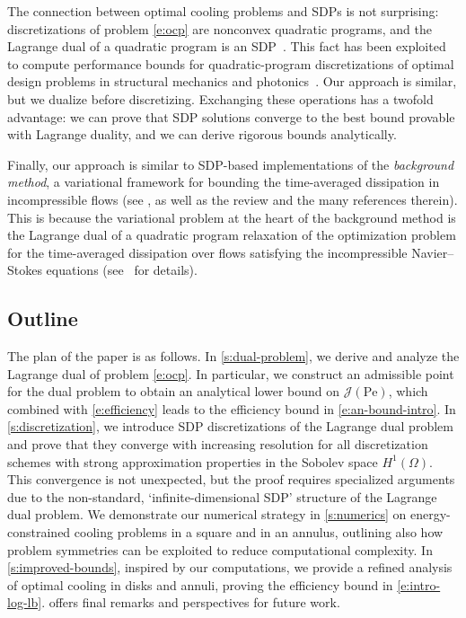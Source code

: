 \documentclass[a4paper, 10pt]{amsart}
\numberwithin{equation}{section}
\theoremstyle{plain}
\theoremstyle{definition}
\theoremstyle{remark}
\newcommand{\Pe}{\mathrm{Pe}}
\newcommand{\ocpval}{\mathcal{J}}
\begin{document}
The connection between optimal cooling problems and SDPs is not surprising: discretizations of problem \cref{e:ocp} are nonconvex quadratic programs, and the Lagrange dual of a quadratic program is an SDP~\cite{Shor1987,Nesterov2000}. This fact has been exploited to compute performance bounds for quadratic-program discretizations of optimal design problems in structural mechanics and photonics~\cite{Tyburec2019,Angeris2019,Angeris2021,Gertler2025,Dalklint2025}. Our approach is similar, but we dualize before discretizing. Exchanging these operations has a twofold advantage: we can prove that SDP solutions converge to the best bound provable with Lagrange duality, and we can derive rigorous bounds analytically. 

Finally, our approach is similar to SDP-based implementations of the \emph{background method}, a variational framework for bounding the time-averaged dissipation in incompressible flows (see \cite{Doering1994,Constantin1995,Doering1996}, as well as the review \cite{Fantuzzi2022} and the many references therein). This is because the variational problem at the heart of the background method is the Lagrange dual of a quadratic program relaxation of the optimization problem for the time-averaged dissipation over flows satisfying the incompressible Navier--Stokes equations (see~\cite{Kerswell1998,Kerswell1999} for details).

\subsection{Outline}
The plan of the paper is as follows. In \cref{s:dual-problem}, we derive and analyze the Lagrange dual of problem \cref{e:ocp}. 
In particular, we construct an admissible point for the dual problem to obtain an analytical lower bound on $\ocpval(\Pe)$, which combined with \cref{e:efficiency} leads to the efficiency bound in \cref{e:an-bound-intro}. In \cref{s:discretization}, we introduce SDP discretizations of the Lagrange dual problem and prove that they converge with increasing resolution for all discretization schemes with strong approximation properties in the Sobolev space $H^1(\Omega)$. This convergence is not unexpected, but the proof requires specialized arguments due to the non-standard, `infinite-dimensional SDP' structure of the Lagrange dual problem. 
We demonstrate our numerical strategy in \cref{s:numerics} on energy-constrained cooling problems in a square and in an annulus, outlining also how problem symmetries can be exploited to reduce computational complexity. 
In \cref{s:improved-bounds}, inspired by our computations, we provide a refined analysis of optimal cooling in disks and annuli, proving the efficiency bound in \cref{e:intro-log-lb}.  offers final remarks and perspectives for future work.
\end{document}
